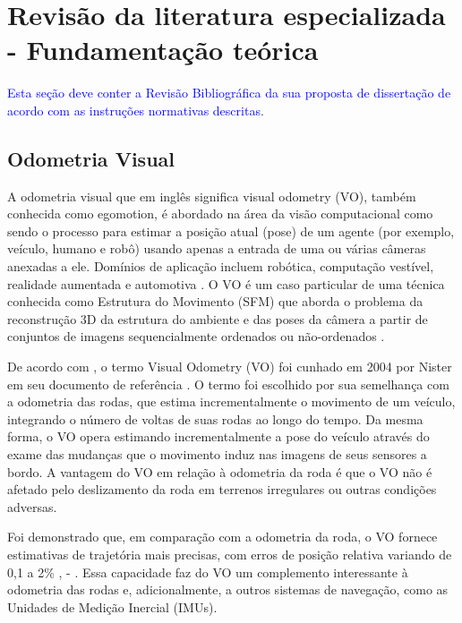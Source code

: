 \chapter{Revis\~ao da literatura especializada - Fundamenta\c{c}\~ao te\'orica}
\label{chapter:odometriavisual}

\textcolor{blue}{Esta seção deve conter a Revisão Bibliográfica da sua proposta de dissertação de acordo com as instruções normativas descritas.}

\section{Odometria Visual}
\label{sec:odometriavisual}

A odometria visual que em inglês significa visual odometry (VO), também conhecida como egomotion, é abordado na área da visão computacional como sendo o processo para  estimar a posição atual (pose) de um agente (por exemplo, veículo, humano e robô) usando apenas a entrada de uma ou várias câmeras anexadas a ele. Domínios de aplicação incluem robótica, computação vestível, realidade aumentada e automotiva \cite{fraundorfer2011visual}. O VO é um caso particular de uma técnica conhecida como Estrutura do Movimento (SFM)  que aborda o problema da reconstrução 3D da estrutura do ambiente e das poses da câmera a partir de conjuntos de imagens sequencialmente ordenados ou não-ordenados \cite{yousif2015overview}.

De acordo com \cite{fraundorfer2011visual}, o termo Visual Odometry (VO) foi cunhado em 2004 por Nister em seu documento de referência \cite{nister2004visual}. O termo foi escolhido por sua semelhança com a odometria das rodas, que estima incrementalmente o movimento de um veículo, integrando o número de voltas de suas rodas ao longo do tempo. Da mesma forma, o VO opera estimando incrementalmente a pose do veículo através do exame das mudanças que o movimento induz nas imagens de seus sensores a bordo. A vantagem do VO em relação à odometria da roda é que o VO não é afetado pelo deslizamento da roda em terrenos irregulares ou outras condições adversas.

Foi demonstrado que, em comparação com a odometria da roda, o VO fornece estimativas de trajetória mais precisas, com erros de posição relativa variando de 0,1 a 2\% \cite{wirth2013visual}, \cite{fraundorfer2011visual} - \cite{nawaf2017towards}. Essa capacidade faz do VO um complemento interessante à odometria das rodas e, adicionalmente, a outros sistemas de navegação, como as Unidades de Medição Inercial (IMUs).

